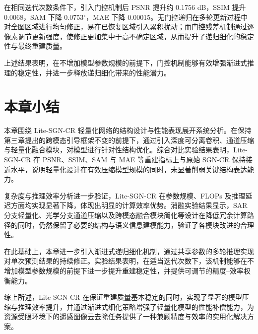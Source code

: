 在相同迭代次数条件下，引入门控机制后 PSNR 提升约 0.1756 dB，SSIM 提升 0.0068，SAM 下降 0.0753$^\circ$，MAE 下降 0.00015。无门控递归在多轮更新过程中对全图区域进行均匀修正，易在已恢复区域引入累积扰动；而门控残差机制通过逐像素调节更新强度，使修正更加集中于高不确定区域，从而提升了递归细化的稳定性与最终重建质量。

上述结果表明，在不增加模型参数规模的前提下，门控机制能够有效增强渐进式推理的稳定性，并进一步释放递归细化带来的性能潜力。

\section{本章小结}

本章围绕 Lite-SGN-CR 轻量化网络的结构设计与性能表现展开系统分析。在保持第三章提出的跨模态引导框架不变的前提下，通过引入深度可分离卷积、通道压缩与轻量化融合模块，对模型进行针对性结构优化。综合对比实验结果表明，Lite-SGN-CR 在 PSNR、SSIM、SAM 与 MAE 等重建指标上与原始 SGN-CR 保持接近水平，说明轻量化设计在有效压缩模型规模的同时，未显著削弱关键结构表达能力。

复杂度与推理效率分析进一步验证，Lite-SGN-CR 在参数规模、FLOPs 及推理延迟方面均实现显著下降，体现出明显的计算效率优势。消融实验结果显示，SAR 分支轻量化、光学分支通道压缩以及跨模态融合模块简化等设计在降低冗余计算路径的同时，仍然保留了必要的结构与语义信息建模能力，验证了各模块改进的合理性。

在此基础上，本章进一步引入渐进式递归细化机制，通过共享参数的多轮推理实现对单次预测结果的持续修正。实验结果表明，在适当迭代次数下，该机制能够在不增加模型参数规模的前提下进一步提升重建稳定性，并提供可调节的精度–效率权衡能力。

综上所述，Lite-SGN-CR 在保证重建质量基本稳定的同时，实现了显著的模型压缩与推理效率提升，并通过渐进式细化策略增强了轻量化模型的性能补偿能力，为资源受限环境下的遥感图像云去除任务提供了一种兼顾精度与效率的实用化解决方案。
